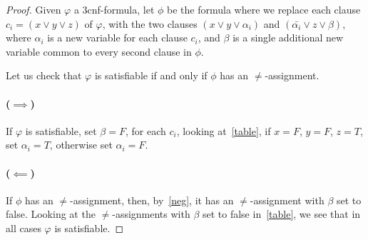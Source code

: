 \begin{proof}
  Given $\varphi$ a 3cnf-formula, let $\phi$ be the formula where we replace
  each clause $c_i = (x \lor y \lor z)$ of $\varphi$, with the two clauses $(x
  \lor y \lor \alpha_i)$ and $(\bar{\alpha_i} \lor z \lor \beta)$, where $\alpha_i$ is a
  new variable for each clause $c_i$, and $\beta$ is a single additional new
  variable common to every second clause in $\phi$.

  Let us check that $\varphi$ is satisfiable if and only if $\phi$ has an
  $\ne$-assignment.

  \paragraph{($\implies$)} If $\varphi$ is satisfiable, set $\beta=F$, for each
  $c_i$, looking at~\ref{table}, if $x=F$, $y=F$, $z=T$, set $\alpha_i=T$,
  otherwise set $\alpha_i=F$.

  \paragraph{($\impliedby$)}
  If $\phi$ has an $\ne$-assignment, then, by~\ref{neg}, it has an
  $\ne$-assignment with $\beta$ set to false. Looking at the $\ne$-assignments
  with $\beta$ set to false in~\ref{table}, we see that in all cases $\varphi$
  is satisfiable.


\end{proof}
